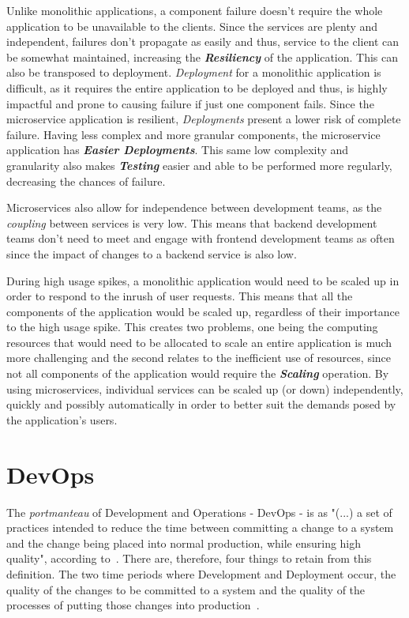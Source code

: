 Unlike monolithic applications, a component failure doesn't require the whole application to be unavailable to the clients. Since the services are plenty and independent, failures don't propagate as easily and thus, service to the client can be somewhat maintained, increasing the \textbf{\textit{Resiliency}} of the application. This can also be transposed to deployment. \textit{Deployment} for a monolithic application is difficult, as it requires the entire application to be deployed and thus, is highly impactful and prone to causing failure if just one component fails. Since the microservice application is resilient, \textit{Deployments} present a lower risk of complete failure. Having less complex and more granular components, the microservice application has \textbf{\textit{Easier Deployments}}. This same low complexity and granularity also makes \textbf{\textit{Testing}} easier and able to be performed more regularly, decreasing the chances of failure. 

Microservices also allow for independence between development teams, as the \textit{coupling} between services is very low. This means that backend development teams don't need to meet and engage with frontend development teams as often since the impact of changes to a backend service is also low.

During high usage spikes, a monolithic application would need to be scaled up in order to respond to the inrush of user requests. This means that all the components of the application would be scaled up, regardless of their importance to the high usage spike. This creates two problems, one being the computing resources that would need to be allocated to scale an entire application is much more challenging and the second relates to the inefficient use of resources, since not all components of the application would require the \textbf{\textit{Scaling}} operation. By using microservices, individual services can be scaled up (or down) independently, quickly and possibly automatically in order to better suit the demands posed by the application's users.


\section{DevOps}\label{state-of-the-art:s:devops}

The \textit{portmanteau} of Development and Operations - DevOps - is as "(...) a set of practices intended to reduce the time between committing a change to a system and the change being placed into normal production, while ensuring high quality", according to~\Parencite{bass_weber_zhu_2015}. There are, therefore, four things to retain from this definition. The two time periods where Development and Deployment occur, the quality of the changes to be committed to a system and the quality of the processes of putting those changes into production~\Parencite{sallin_kropp_anslow_quilty_meier_2021}.


